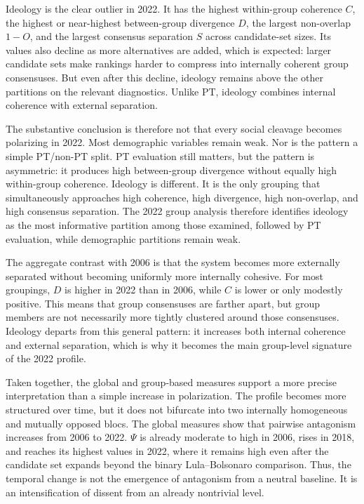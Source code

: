 \documentclass[12pt]{article}
\begin{document}
Ideology is the clear outlier in 2022. It has the highest within-group
coherence \(C\), the highest or near-highest between-group divergence \(D\),
the largest non-overlap \(1-O\), and the largest consensus separation
\(S\) across candidate-set sizes. Its values also decline as more alternatives
are added, which is expected: larger candidate sets make rankings harder to
compress into internally coherent group consensuses. But even after this
decline, ideology remains above the other partitions on the relevant
diagnostics. Unlike PT, ideology combines internal coherence with external
separation.

The substantive conclusion is therefore not that every social cleavage becomes
polarizing in 2022. Most demographic variables remain weak. Nor is the pattern
a simple PT/non-PT split. PT evaluation still matters, but the pattern is
asymmetric: it produces high between-group divergence without equally high
within-group coherence. Ideology is different. It is the only grouping that
simultaneously approaches high coherence, high divergence, high non-overlap,
and high consensus separation.
The 2022 group analysis therefore identifies ideology as the most informative
partition among those examined, followed by PT evaluation, while demographic
partitions remain weak.


The aggregate contrast with 2006 is that the system becomes more externally
separated without becoming uniformly more internally cohesive. For most
groupings, \(D\) is higher in 2022 than in 2006, while \(C\) is lower or only
modestly positive. This means that group consensuses are farther apart, but
group members are not necessarily more tightly clustered around those
consensuses. Ideology departs from this general pattern: it increases both
internal coherence and external separation, which is why it becomes the main
group-level signature of the 2022 profile.


Taken together, the global and group-based measures support a more precise
interpretation than a simple increase in polarization. The profile becomes
more structured over time, but it does not bifurcate into two internally
homogeneous and mutually opposed blocs. The global measures show that pairwise
antagonism increases from 2006 to 2022. \(\Psi\) is already moderate to high
in 2006, rises in 2018, and reaches its highest values in 2022, where it
remains high even after the candidate set expands beyond the binary
Lula--Bolsonaro comparison. Thus, the temporal change is not the emergence of
antagonism from a neutral baseline. It is an intensification of dissent from
an already nontrivial level.
\end{document}
